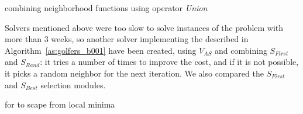 \begin{algorithm}[H]
\dontprintsemicolon
\SetNoline
{}
\caption{\As{} combining neighborhood functions using operator {\it Union}}\label{as:golfers_union}
\end{algorithm}

Solvers mentioned above were too slow to solve instances of the problem with more than 3 weeks, so another solver implementing the \as{} described in Algorithm~\ref{as:golfers_b001} have been created, using $V_{AS}$ and combining $S_{First}$ and $S_{Rand}$: it tries a number of times to improve the cost, and if it is not possible, it picks a random neighbor for the next iteration. We also compared the $S_{First}$ and $S_{Best}$ selection modules.

\begin{algorithm}[H]
\dontprintsemicolon
\SetNoline
{}
\caption{\As{} for \SGP{} to scape from local minima}\label{as:golfers_b001}
\end{algorithm}

